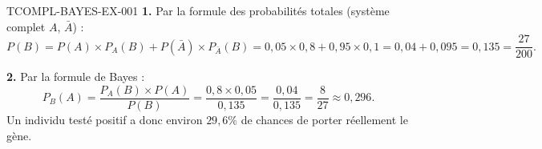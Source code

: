 \begin{corrige}{TCOMPL-BAYES-EX-001}
\textbf{1.} Par la formule des probabilités totales (système complet $A$, $\bar A$) :
\[
  P(B) = P(A)\times P_A(B) + P(\bar A)\times P_{\bar A}(B) = 0{,}05\times0{,}8 + 0{,}95\times0{,}1 = 0{,}04+0{,}095 = 0{,}135 = \frac{27}{200}.
\]

\textbf{2.} Par la formule de Bayes :
\[
  P_B(A) = \frac{P_A(B)\times P(A)}{P(B)} = \frac{0{,}8\times0{,}05}{0{,}135} = \frac{0{,}04}{0{,}135} = \frac{8}{27} \approx 0{,}296.
\]
Un individu testé positif a donc environ $29{,}6\%$ de chances de porter réellement le gène.
\end{corrige}
